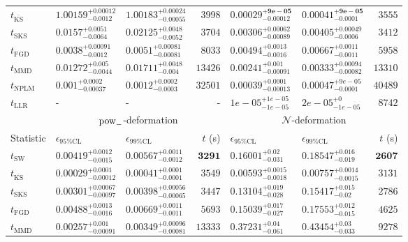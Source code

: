 \begin{tabular}{l|llr|llr}
	$t_{\overline{\mathrm{KS}}}$ & $1.00159_{-0.0012}^{+0.00012}$ & $1.00183_{-0.00055}^{+0.00024}$ & $3998$ & ${\mathbf{0.00029_{-0.00012}^{+9e-05}}}$ & ${\mathbf{0.00041_{-0.0001}^{+9e-05}}}$ & $3555$ \\
	$t_{\mathrm{SKS}}$ & $0.0157_{-0.0064}^{+0.0051}$ & $0.02125_{-0.0052}^{+0.0048}$ & $3704$ & $0.00306_{-0.00089}^{+0.00062}$ & $0.00405_{-0.0006}^{+0.00049}$ & $3412$ \\
	$t_{\mathrm{FGD}}$ & ${\mathbf{0.0038_{-0.0012}^{+0.00091}}}$ & ${\mathbf{0.0051_{-0.00081}^{+0.00081}}}$ & $8033$ & $0.00494_{-0.0016}^{+0.0013}$ & $0.00667_{-0.0011}^{+0.0011}$ & $5958$ \\
	$t_{\mathrm{MMD}}$ & $0.01272_{-0.0044}^{+0.005}$ & $0.01711_{-0.004}^{+0.0048}$ & $13426$ & $0.00241_{-0.00091}^{+0.001}$ & $0.00333_{-0.00082}^{+0.00094}$ & $13310$ \\
\rowcolor{red!35}	$t_{\mathrm{NPLM}}$ & $0.001_{-0.00037}^{+0.0002}$ & $0.0012_{-0.0003}^{+0.0002}$ & $32501$ & $0.00039_{-0.00013}^{+0.0001}$ & $0.00047_{-0.0001}^{+9e-05}$ & $40489$ \\
	$t_{\mathrm{LLR}}$ & - & - & - & $1e-05_{-1e-05}^{+1e-05}$ & $2e-05_{-1e-05}^{+0}$ & $8742$ \\
	\toprule
	\multicolumn{1}{c}{} & \multicolumn{3}{c}{$\rm{pow}_{-}$-deformation} & \multicolumn{3}{c}{$\mathcal{N}$-deformation} \\
	Statistic & $\epsilon_{95\%\mathrm{CL}}$ & $\epsilon_{99\%\mathrm{CL}}$ & $t$ (s) & $\epsilon_{95\%\mathrm{CL}}$ & $\epsilon_{99\%\mathrm{CL}}$ & $t$ (s) \\
	\midrule
	$t_{\mathrm{SW}}$ & $0.00419_{-0.0015}^{+0.0012}$ & $0.00567_{-0.0012}^{+0.0011}$ & ${\mathbf{3291}}$ & $0.16001_{-0.031}^{+0.02}$ & $0.18547_{-0.019}^{+0.016}$ & ${\mathbf{2607}}$ \\
	$t_{\overline{\mathrm{KS}}}$ & ${\mathbf{0.00029_{-0.00012}^{+0.0001}}}$ & ${\mathbf{0.00041_{-0.0001}^{+0.0001}}}$ & $3549$ & ${\mathbf{0.00593_{-0.0018}^{+0.0015}}}$ & ${\mathbf{0.00757_{-0.0015}^{+0.0014}}}$ & $3131$ \\
	$t_{\mathrm{SKS}}$ & $0.00301_{-0.00097}^{+0.00067}$ & $0.00398_{-0.00065}^{+0.00056}$ & $3447$ & $0.13104_{-0.028}^{+0.019}$ & $0.15417_{-0.02}^{+0.015}$ & $2786$ \\
	$t_{\mathrm{FGD}}$ & $0.00488_{-0.0016}^{+0.0013}$ & $0.00669_{-0.0011}^{+0.0011}$ & $5693$ & $0.15039_{-0.027}^{+0.017}$ & $0.17553_{-0.015}^{+0.012}$ & $4625$ \\
	$t_{\mathrm{MMD}}$ & $0.00257_{-0.00091}^{+0.001}$ & $0.00349_{-0.00081}^{+0.00096}$ & $13333$ & $0.37231_{-0.061}^{+0.04}$ & $0.43454_{-0.033}^{+0.03}$ & $9278$ \\

\end{tabular}
